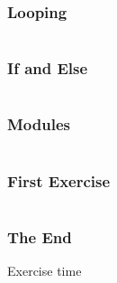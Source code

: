 \documentclass{beamer}
\begin{document}
\begin{frame}[fragile]

    \frametitle{Looping}

    \begin{columns}[t]



    \end{columns}

\end{frame}




\begin{frame}[fragile]

    \frametitle{If and Else}

    \begin{columns}[t]



    \end{columns}

\end{frame}



\begin{frame}[fragile]

    \frametitle{Modules}

    \begin{columns}[t]



    \end{columns}

\end{frame}



\begin{frame}[fragile]

    \frametitle{First Exercise}

    \begin{columns}[t]



    \end{columns}

\end{frame}





\frame
{
    \frametitle{The End}

    Exercise time

}




\end{document}
